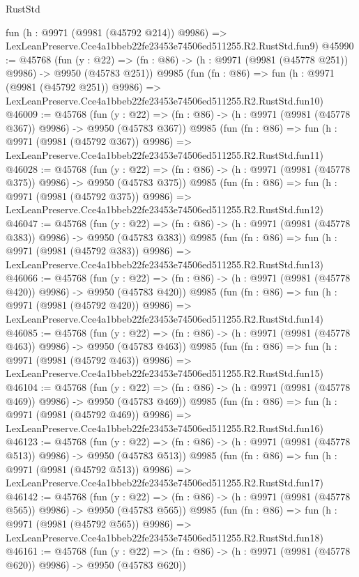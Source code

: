\begin{lexlean}{RustStd}
\begin{coremodule}
    fun (h : @9971 (@9981 (@45792 @214)) @9986) =>
    LexLeanPreserve.Cce4a1bbeb22fe23453e74506ed511255.R2.RustStd.fun9)
@45990 := @45768
    (fun (y : @22) => (fn : @86) -> (h : @9971 (@9981 (@45778 @251)) @9986) -> @9950 (@45783 @251))
    @9985
    (fun (fn : @86) =>
    fun (h : @9971 (@9981 (@45792 @251)) @9986) =>
    LexLeanPreserve.Cce4a1bbeb22fe23453e74506ed511255.R2.RustStd.fun10)
@46009 := @45768
    (fun (y : @22) => (fn : @86) -> (h : @9971 (@9981 (@45778 @367)) @9986) -> @9950 (@45783 @367))
    @9985
    (fun (fn : @86) =>
    fun (h : @9971 (@9981 (@45792 @367)) @9986) =>
    LexLeanPreserve.Cce4a1bbeb22fe23453e74506ed511255.R2.RustStd.fun11)
@46028 := @45768
    (fun (y : @22) => (fn : @86) -> (h : @9971 (@9981 (@45778 @375)) @9986) -> @9950 (@45783 @375))
    @9985
    (fun (fn : @86) =>
    fun (h : @9971 (@9981 (@45792 @375)) @9986) =>
    LexLeanPreserve.Cce4a1bbeb22fe23453e74506ed511255.R2.RustStd.fun12)
@46047 := @45768
    (fun (y : @22) => (fn : @86) -> (h : @9971 (@9981 (@45778 @383)) @9986) -> @9950 (@45783 @383))
    @9985
    (fun (fn : @86) =>
    fun (h : @9971 (@9981 (@45792 @383)) @9986) =>
    LexLeanPreserve.Cce4a1bbeb22fe23453e74506ed511255.R2.RustStd.fun13)
@46066 := @45768
    (fun (y : @22) => (fn : @86) -> (h : @9971 (@9981 (@45778 @420)) @9986) -> @9950 (@45783 @420))
    @9985
    (fun (fn : @86) =>
    fun (h : @9971 (@9981 (@45792 @420)) @9986) =>
    LexLeanPreserve.Cce4a1bbeb22fe23453e74506ed511255.R2.RustStd.fun14)
@46085 := @45768
    (fun (y : @22) => (fn : @86) -> (h : @9971 (@9981 (@45778 @463)) @9986) -> @9950 (@45783 @463))
    @9985
    (fun (fn : @86) =>
    fun (h : @9971 (@9981 (@45792 @463)) @9986) =>
    LexLeanPreserve.Cce4a1bbeb22fe23453e74506ed511255.R2.RustStd.fun15)
@46104 := @45768
    (fun (y : @22) => (fn : @86) -> (h : @9971 (@9981 (@45778 @469)) @9986) -> @9950 (@45783 @469))
    @9985
    (fun (fn : @86) =>
    fun (h : @9971 (@9981 (@45792 @469)) @9986) =>
    LexLeanPreserve.Cce4a1bbeb22fe23453e74506ed511255.R2.RustStd.fun16)
@46123 := @45768
    (fun (y : @22) => (fn : @86) -> (h : @9971 (@9981 (@45778 @513)) @9986) -> @9950 (@45783 @513))
    @9985
    (fun (fn : @86) =>
    fun (h : @9971 (@9981 (@45792 @513)) @9986) =>
    LexLeanPreserve.Cce4a1bbeb22fe23453e74506ed511255.R2.RustStd.fun17)
@46142 := @45768
    (fun (y : @22) => (fn : @86) -> (h : @9971 (@9981 (@45778 @565)) @9986) -> @9950 (@45783 @565))
    @9985
    (fun (fn : @86) =>
    fun (h : @9971 (@9981 (@45792 @565)) @9986) =>
    LexLeanPreserve.Cce4a1bbeb22fe23453e74506ed511255.R2.RustStd.fun18)
@46161 := @45768
    (fun (y : @22) => (fn : @86) -> (h : @9971 (@9981 (@45778 @620)) @9986) -> @9950 (@45783 @620))

\end{coremodule}
\end{lexlean}
